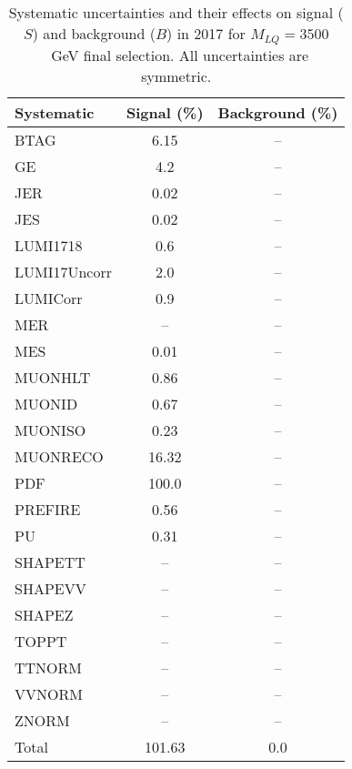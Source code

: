 \begin{table}[htbp]
\begin{center}
\caption{Systematic uncertainties and their effects on signal ($S$) and background ($B$) in 2017 for $M_{LQ}=3500$~GeV final selection. All uncertainties are symmetric.}
\begin{tabular}{lcc}
\hline\hline
Systematic & Signal (\%) & Background (\%) \\ \hline 
BTAG & 6.15 & --\\ 
GE & 4.2 & --\\ 
JER & 0.02 & --\\ 
JES & 0.02 & --\\ 
LUMI1718 & 0.6 & --\\ 
LUMI17Uncorr & 2.0 & --\\ 
LUMICorr & 0.9 & --\\ 
MER & -- & --\\ 
MES & 0.01 & --\\ 
MUONHLT & 0.86 & --\\ 
MUONID & 0.67 & --\\ 
MUONISO & 0.23 & --\\ 
MUONRECO & 16.32 & --\\ 
PDF & 100.0 & --\\ 
PREFIRE & 0.56 & --\\ 
PU & 0.31 & --\\ 
SHAPETT & -- & --\\ 
SHAPEVV & -- & --\\ 
SHAPEZ & -- & --\\ 
TOPPT & -- & --\\ 
TTNORM & -- & --\\ 
VVNORM & -- & --\\ 
ZNORM & -- & --\\ 
Total & 101.63 & 0.0\\ \hline \hline
\end{tabular}
\label{tab:SysUncertainties_uujj_3500}
\end{center}
\end{table}

